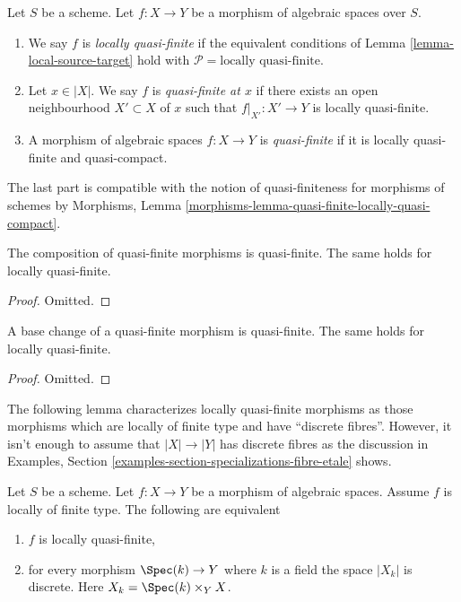 \begin{definition}
\label{definition-locally-quasi-finite}
Let $S$ be a scheme.
Let $f : X \to Y$ be a morphism of algebraic spaces over $S$.
\begin{enumerate}
\item We say $f$ is
{\it locally quasi-finite} if the equivalent conditions of
Lemma \ref{lemma-local-source-target} hold with
$\mathcal{P} = \text{locally quasi-finite}$.
\item Let $x \in |X|$. We say $f$ is {\it quasi-finite at $x$}
if there exists an open neighbourhood $X' \subset X$ of $x$ such
that $f|_{X'} : X' \to Y$ is locally quasi-finite.
\item A morphism of algebraic spaces $f : X \to Y$ is
{\it quasi-finite} if it is locally quasi-finite and quasi-compact.
\end{enumerate}
\end{definition}

\noindent
The last part is compatible with the notion of quasi-finiteness for morphisms
of schemes by
Morphisms, Lemma \ref{morphisms-lemma-quasi-finite-locally-quasi-compact}.

\begin{lemma}
\label{lemma-composition-quasi-finite}
The composition of quasi-finite morphisms is quasi-finite.
The same holds for locally quasi-finite.
\end{lemma}

\begin{proof}
Omitted.
\end{proof}

\begin{lemma}
\label{lemma-base-change-quasi-finite}
A base change of a quasi-finite morphism is quasi-finite.
The same holds for locally quasi-finite.
\end{lemma}

\begin{proof}
Omitted.
\end{proof}

\noindent
The following lemma characterizes locally quasi-finite morphisms as those
morphisms which are locally of finite type and have ``discrete fibres''.
However, it isn't enough to assume that $|X| \to |Y|$ has discrete fibres
as the discussion in
Examples, Section \ref{examples-section-specializations-fibre-etale}
shows.

\begin{lemma}
\label{lemma-locally-quasi-finite}
Let $S$ be a scheme. Let $f : X \to Y$ be a morphism of algebraic spaces.
Assume $f$ is locally of finite type. The following are equivalent
\begin{enumerate}
\item $f$ is locally quasi-finite,
\item for every morphism $\Spec(k) \to Y$ where $k$ is a field
the space $|X_k|$ is discrete. Here $X_k = \Spec(k) \times_Y X$.
\end{enumerate}
\end{lemma}

